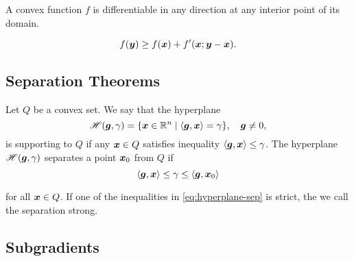 \begin{thm}
    A convex function \(f\) is differentiable in any direction at any
interior point of its domain.
\end{thm}

\begin{lemma}
    \begin{equation}
        f(\bm{y}) \ge f(\bm{x}) + f'(\bm{x}; \bm{y} - \bm{x}).
    \end{equation}
\end{lemma}

\subsection{Separation Theorems}\label{subsec:sep-thm}
\begin{defn}
    Let $Q$ be a convex set. We say that the hyperplane
    \[
        \mathscr{H}(\bm{g}, \gamma) = \{ \bm{x} \in \mathbb{R}^n \mid \left\langle \bm{g}, \bm{x} \right\rangle = \gamma\},\quad \bm{g} \ne 0,  
    \]
    is supporting to \(Q\) if any \(\bm{x} \in Q\) satisfies inequality \(\left\langle \bm{g}, \bm{x} \right\rangle \le \gamma\). 
    The hyperplane \(\mathscr{H}(\bm{g}, \gamma)\) separates a point \(\bm{x}_0\) from \(Q\) if 
    \begin{equation}\label{eq:hyperplane-sep}
        \left\langle \bm{g}, \bm{x} \right\rangle \le \gamma \le \left\langle \bm{g}, \bm{x}_0 \right\rangle
    \end{equation}
        
    for all \(\bm{x} \in Q\). If one of the inequalities in \ref{eq:hyperplane-sep} is strict, the we call the separation
    strong.
\end{defn}

\subsection{Subgradients}